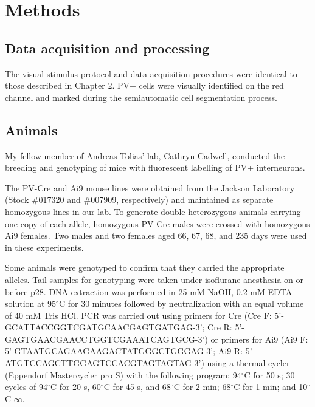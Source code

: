 \section{Methods}
\subsection{Data acquisition and processing}
The visual stimulus protocol and  data acquisition procedures  were identical to those described in Chapter 2. PV+ cells were visually identified on the red channel and marked during the semiautomatic cell segmentation process.

\subsection{Animals}
My fellow member of Andreas Tolias' lab, Cathryn Cadwell, conducted the breeding and genotyping of mice with fluorescent labelling of PV+ interneurons.

The PV-Cre and Ai9 mouse lines were obtained from the Jackson Laboratory (Stock \#017320 and \#007909, respectively) and maintained as separate homozygous lines in our lab.  To generate double heterozygous animals carrying one copy of each allele, homozygous PV-Cre males were crossed with homozygous Ai9 females. Two males and two females aged 66, 67, 68, and 235 days were used in these experiments. 

Some animals were genotyped to confirm that they carried the appropriate alleles. Tail samples for genotyping were taken under isoflurane anesthesia on or before p28.  DNA extraction was performed in 25 mM NaOH, 0.2 mM EDTA solution at 95$^\circ$C for 30 minutes followed by neutralization with an equal volume of 40 mM Tris HCl.  PCR was carried out using primers for Cre (Cre F: 5'-GCATTA\-CCG\-GTC\-GAT\-GCA\-ACG\-AGT\-GATGAG-3'; Cre R: 5'-GAGTGA\-ACG\-AAC\-CTG\-GTC\-GAA\-ATC\-AGTGCG-3') or primers for Ai9 (Ai9 F: 5'-GTAATG\-CAG\-AAG\-AAG\-ACT\-ATG\-GGC\-TGGGAG-3'; Ai9 R: 5'-ATGTCC\-AGC\-TTG\-GAG\-TCC\-ACG\-TAG\-TAGTAG-3') using a thermal cycler (Eppendorf Mastercycler pro S) with the following program: 94$^\circ$C for 50 s; 30 cycles of 94$^\circ$C for 20 s, 60$^\circ$C for 45 s, and 68$^\circ$C for 2 min; 68$^\circ$C for 1 min; and 10$^\circ$C $\infty$.


